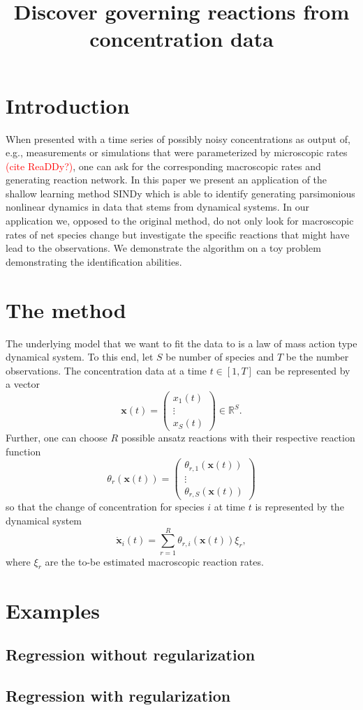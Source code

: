 \documentclass[oneside, abstracton, titlepage]{scrartcl}
\begin{document}
	\title{Discover governing reactions from concentration data}
	\maketitle
	
	\section*{Introduction}
	When presented with a time series of possibly noisy concentrations as output of, e.g.,  measurements or simulations that were parameterized by microscopic rates \textcolor{red}{(cite ReaDDy?)}, one can ask for the corresponding macroscopic rates and generating reaction network. 
	In this paper we present an application of the shallow learning method SINDy \cite{Brunton2015} which is able to identify generating parsimonious nonlinear dynamics in data that stems from dynamical systems.
	In our application we, opposed to the original method, do not only look for macroscopic rates of net species change but investigate the specific reactions that might have lead to the observations.
	We demonstrate the algorithm on a toy problem demonstrating the identification abilities.
	
	\section*{The method}
	The underlying model that we want to fit the data to is a law of mass action type dynamical system. To this end, let $S$ be number of species and $T$ be the number observations. The concentration data at a time $t\in [1, T]$ can be represented by a vector
	\[
	\mathbf{x}(t)=\begin{pmatrix}
	x_1(t)\\ \vdots \\ x_S(t)
	\end{pmatrix}\in \mathbb{R}^S.
	\]
	Further, one can choose $R$ possible ansatz reactions with their respective reaction function
	\[
	\theta_r(\textbf{x}(t))=\begin{pmatrix}
	\theta_{r,1}(\textbf{x}(t)) \\ \vdots \\ \theta_{r,S}(\textbf{x}(t))
	\end{pmatrix}
	\]
	so that the change of concentration for species $i$ at time $t$ is represented by the dynamical system
	\[
	\dot{\textbf{x}}_i(t) = \sum_{r=1}^{R}\theta_{r,i}(\textbf{x}(t))\xi_r,
	\]
	where $\xi_r$ are the to-be estimated macroscopic reaction rates.
	
	\section*{Examples}
	
	\subsection*{Regression without regularization}
	
	\subsection*{Regression with regularization}
	
	
	\newpage
	
	
	
\end{document}
